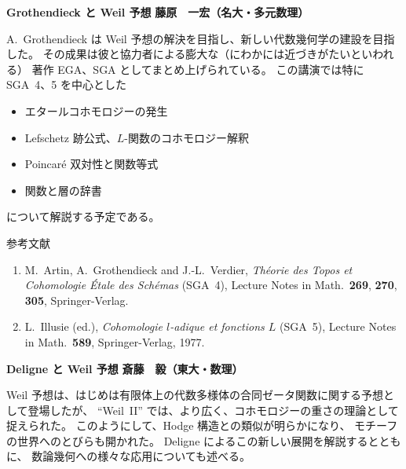 \documentclass[uplatex,dvipdfmx]{jlreq}
\begin{document}
\newpage

\noindent
{\large\bfseries Grothendieck と Weil 予想}
\hfill
{\large\bfseries 藤原　一宏（名大・多元数理）}

\bigskip

A.~Grothendieck は Weil 予想の解決を目指し、新しい代数幾何学の建設を目指した。
その成果は彼と協力者による膨大な（にわかには近づきがたいといわれる）
著作 EGA、SGA としてまとめ上げられている。
この講演では特に SGA~4、5 を中心とした
\begin{itemize}
  \item エタールコホモロジーの発生
  \item Lefschetz 跡公式、$L$-関数のコホモロジー解釈
  \item Poincaré 双対性と関数等式
  \item 関数と層の辞書
\end{itemize}
について解説する予定である。

\vspace{6pt}

\begin{center}
  \textsc{参考文献}
\end{center}
\begin{enumerate}
  \item[{[SGA4]}] M.~Artin, A.~Grothendieck and J.-L.~Verdier,
        \textit{Théorie des Topos et Cohomologie Étale des Schémas} (SGA~4),
        Lecture Notes in Math.~\textbf{269}, \textbf{270}, \textbf{305},
        Springer-Verlag.
  \item[{[SGA5]}] L.~Illusie (ed.),
        \textit{Cohomologie $l$-adique et fonctions $L$} (SGA~5),
        Lecture Notes in Math.~\textbf{589},
        Springer-Verlag, 1977.
\end{enumerate}

\newpage

\noindent
{\large\bfseries Deligne と Weil 予想}
\hfill
{\large\bfseries 斎藤　毅（東大・数理）}

\bigskip

Weil 予想は、はじめは有限体上の代数多様体の合同ゼータ関数に関する予想として登場したが、
``Weil~II'' では、より広く、コホモロジーの重さの理論として捉えられた。
このようにして、Hodge 構造との類似が明らかになり、
モチーフの世界へのとびらも開かれた。
Deligne によるこの新しい展開を解説するとともに、
数論幾何への様々な応用についても述べる。
\end{document}
